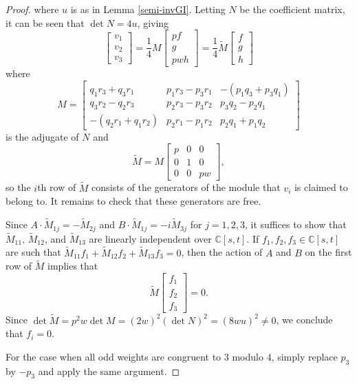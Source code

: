 \documentclass[10pt,a4paper]{amsart}
\begin{document}
\begin{proof}
    where \(u\) is as in Lemma \ref{semi-invGI}. Letting \(N\) be the coefficient matrix, it can be seen that \(\det N = 4u\), giving
    \begin{equation*}
        \begin{bmatrix}
            v_1 \\
            v_2 \\
            v_3
        \end{bmatrix}
        = \frac{1}{4}M
        \begin{bmatrix}
            pf \\
            g \\
            pwh
        \end{bmatrix} =
        \frac{1}{4} \tilde{M}
        \begin{bmatrix}
            f \\
            g \\ 
            h
        \end{bmatrix}
    \end{equation*}
    where
    \begin{equation*}
        M = 
        \begin{bmatrix}
            q_1r_3+q_3r_1 & p_1r_3 - p_3r_1 & -(p_1q_3+p_3q_1) \\
            q_3r_2-q_2r_3 & p_2r_3 - p_3r_2 & p_3q_2-p_2q_1 \\
            -(q_2r_1+q_1r_2) & p_2r_1 - p_1r_2 & p_2q_1+p_1q_2
        \end{bmatrix}
    \end{equation*}
    is the adjugate of \(N\) and
    \begin{equation*}
        \tilde{M} = M
        \begin{bmatrix}
            p & 0 & 0 \\
            0 & 1 & 0 \\
            0 & 0 & pw
        \end{bmatrix},
    \end{equation*}
    so the \(i\)th row of \(\tilde{M}\) consists of the generators of the module that \(v_i\) is claimed to belong to. It remains to check that these generators are free.
    
    Since \(A \cdot \tilde{M}_{1j} = -\tilde{M}_{2j}\) and \(B \cdot \tilde{M}_{1j} = -i\tilde{M}_{3j}\) for \(j = 1,2,3\), it suffices to show that \(\tilde{M}_{11},\, \tilde{M}_{12}\), and \(\tilde{M}_{13}\) are linearly independent over \(\mathbb{C}[s,t]\). If \(f_1, f_2, f_3 \in \mathbb{C}[s,t]\) are such that \(\tilde{M}_{11}f_1 + \tilde{M}_{12}f_2 + \tilde{M}_{13}f_3 = 0 \), then the action of \(A\) and \(B\) on the first row of \(\tilde{M}\) implies that 
    \begin{equation*}
        \tilde{M}
        \begin{bmatrix}
            f_1 \\ 
            f_2 \\ 
            f_3
        \end{bmatrix}
        = 0.
    \end{equation*}
    Since \(\det \tilde{M} = p^2w \det M = (2w)^2 (\det N)^2 = (8wu)^2 \neq 0\), we conclude that \(f_i = 0\).
    
    For the case when all odd weights are congruent to \(3\) modulo \(4\), simply replace \(p_3\) by \(-p_3\) and apply the same argument.
\end{proof}
\end{document}
